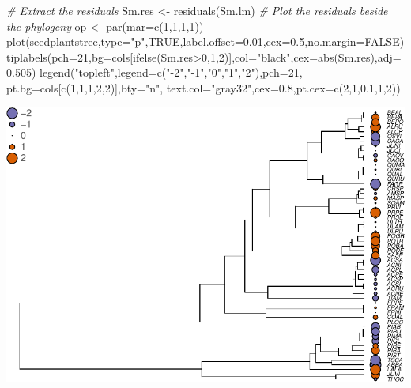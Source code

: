 \documentclass[
]{book}
\newenvironment{Shaded}{\begin{snugshade}}{\end{snugshade}}
\newcommand{\AttributeTok}[1]{\textcolor[rgb]{0.77,0.63,0.00}{#1}}
\newcommand{\CommentTok}[1]{\textcolor[rgb]{0.56,0.35,0.01}{\textit{#1}}}
\newcommand{\ConstantTok}[1]{\textcolor[rgb]{0.00,0.00,0.00}{#1}}
\newcommand{\DecValTok}[1]{\textcolor[rgb]{0.00,0.00,0.81}{#1}}
\newcommand{\FloatTok}[1]{\textcolor[rgb]{0.00,0.00,0.81}{#1}}
\newcommand{\FunctionTok}[1]{\textcolor[rgb]{0.00,0.00,0.00}{#1}}
\newcommand{\NormalTok}[1]{#1}
\newcommand{\OtherTok}[1]{\textcolor[rgb]{0.56,0.35,0.01}{#1}}
\newcommand{\SpecialCharTok}[1]{\textcolor[rgb]{0.00,0.00,0.00}{#1}}
\newcommand{\StringTok}[1]{\textcolor[rgb]{0.31,0.60,0.02}{#1}}
\begin{document}
\begin{Shaded}
\begin{Highlighting}[]
\CommentTok{\# Extract the residuals}
\NormalTok{Sm.res }\OtherTok{\textless{}{-}} \FunctionTok{residuals}\NormalTok{(Sm.lm)}
\CommentTok{\# Plot the residuals beside the phylogeny}
\NormalTok{op }\OtherTok{\textless{}{-}} \FunctionTok{par}\NormalTok{(}\AttributeTok{mar=}\FunctionTok{c}\NormalTok{(}\DecValTok{1}\NormalTok{,}\DecValTok{1}\NormalTok{,}\DecValTok{1}\NormalTok{,}\DecValTok{1}\NormalTok{))}
\FunctionTok{plot}\NormalTok{(seedplantstree,}\AttributeTok{type=}\StringTok{"p"}\NormalTok{,}\ConstantTok{TRUE}\NormalTok{,}\AttributeTok{label.offset=}\FloatTok{0.01}\NormalTok{,}\AttributeTok{cex=}\FloatTok{0.5}\NormalTok{,}\AttributeTok{no.margin=}\ConstantTok{FALSE}\NormalTok{)}
\FunctionTok{tiplabels}\NormalTok{(}\AttributeTok{pch=}\DecValTok{21}\NormalTok{,}\AttributeTok{bg=}\NormalTok{cols[}\FunctionTok{ifelse}\NormalTok{(Sm.res}\SpecialCharTok{\textgreater{}}\DecValTok{0}\NormalTok{,}\DecValTok{1}\NormalTok{,}\DecValTok{2}\NormalTok{)],}\AttributeTok{col=}\StringTok{"black"}\NormalTok{,}\AttributeTok{cex=}\FunctionTok{abs}\NormalTok{(Sm.res),}\AttributeTok{adj=}\FloatTok{0.505}\NormalTok{)}
\FunctionTok{legend}\NormalTok{(}\StringTok{"topleft"}\NormalTok{,}\AttributeTok{legend=}\FunctionTok{c}\NormalTok{(}\StringTok{"{-}2"}\NormalTok{,}\StringTok{"{-}1"}\NormalTok{,}\StringTok{"0"}\NormalTok{,}\StringTok{"1"}\NormalTok{,}\StringTok{"2"}\NormalTok{),}\AttributeTok{pch=}\DecValTok{21}\NormalTok{,}
       \AttributeTok{pt.bg=}\NormalTok{cols[}\FunctionTok{c}\NormalTok{(}\DecValTok{1}\NormalTok{,}\DecValTok{1}\NormalTok{,}\DecValTok{1}\NormalTok{,}\DecValTok{2}\NormalTok{,}\DecValTok{2}\NormalTok{)],}\AttributeTok{bty=}\StringTok{"n"}\NormalTok{,}
       \AttributeTok{text.col=}\StringTok{"gray32"}\NormalTok{,}\AttributeTok{cex=}\FloatTok{0.8}\NormalTok{,}\AttributeTok{pt.cex=}\FunctionTok{c}\NormalTok{(}\DecValTok{2}\NormalTok{,}\DecValTok{1}\NormalTok{,}\FloatTok{0.1}\NormalTok{,}\DecValTok{1}\NormalTok{,}\DecValTok{2}\NormalTok{))}
\end{Highlighting}
\end{Shaded}

\includegraphics{pcm-workshop_files/figure-latex/Challenge 1 - solution-1.pdf}
\end{document}
